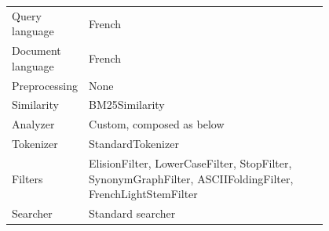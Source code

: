 \begin{table}[h!]
    \centering
    \begin{tabular}{l p{0.8\linewidth}}
    Query language & French\\
    Document language & French\\
    Preprocessing & None\\
    Similarity & BM25Similarity\\
    Analyzer & Custom, composed as below\\
    Tokenizer & StandardTokenizer\\
    Filters & ElisionFilter, LowerCaseFilter, StopFilter, SynonymGraphFilter, ASCIIFoldingFilter, FrenchLightStemFilter\\
    Searcher & Standard searcher
    \end{tabular}
\end{table}